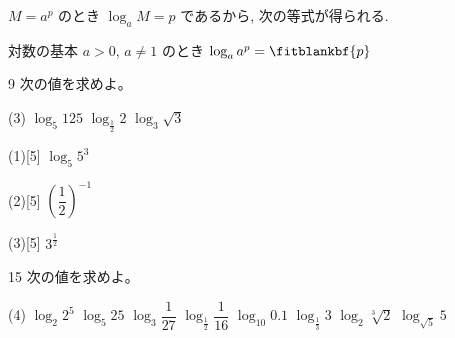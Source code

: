 \documentclass[14pt,dvipdfmx]{jsarticle}
\begin{document}
\vspace{-1.8zw}%
$M = a^p$ のとき $\log_{a} M = p$ であるから, 次の等式が得られる.

\begin{theorembox}{対数の基本}
  $a > 0$, $a \neq 1$ のとき\qquad
  $\log_{a} a^{p} = \fitblankbf{p}$
\end{theorembox}

\begin{exampleprob}{9}
  次の値を求めよ。
  \begin{tasks}[label=(\arabic*), label-width=1.6zw, item-indent=2zw, after-item-skip=0.1em](3)
    \task $\log_{5} 125$
    \task $\log_{\frac{1}{2}} 2$
    \task $\log_{3} \sqrt{3}$
  \end{tasks}
\end{exampleprob}

\noindent
\begin{minipage}[t]{0.32\linewidth}
\begin{answerbox}{(1)}[5]
  $\log_{5} 5^{3}$
\end{answerbox}
\end{minipage}\hfill
\begin{minipage}[t]{0.32\linewidth}
\begin{answerbox}{(2)}[5]
  $\left(\dfrac{1}{2}\right)^{-1}$
\end{answerbox}
\end{minipage}\hfill
\begin{minipage}[t]{0.32\linewidth}
\begin{answerbox}{(3)}[5]
  $3^{\frac{1}{2}}$
\end{answerbox}
\end{minipage}

\begin{practiceprob}{15}
  次の値を求めよ。
  \begin{tasks}[label=(\arabic*), label-width=1.6zw, item-indent=2zw, after-item-skip=0.08em](4)
    \task $\log_{2} 2^{5}$
    \task $\log_{5} 25$
    \task $\log_{3} \dfrac{1}{27}$
    \task $\log_{\frac{1}{2}} \dfrac{1}{16}$
    \task $\log_{10} 0.1$
    \task $\log_{\frac{1}{3}} 3$
    \task $\log_{2} \sqrt[3]{2}$
    \task $\log_{\sqrt{5}} 5$
  \end{tasks}
\end{practiceprob}
\end{document}
